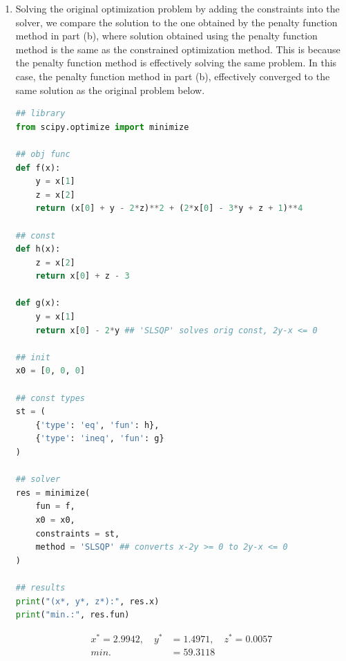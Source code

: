 \documentclass{article}
\begin{document}
\begin{enumerate}
\begin{enumerate}
        \item Solving the original optimization problem by adding the constraints into the solver, we compare the solution to the one obtained by the penalty function method in part (b), where solution obtained using the penalty function method is the same as the constrained optimization method. This is because the penalty function method is effectively solving the same problem. In this case, the penalty function method in part (b), effectively converged to the same solution as the original problem below.\\

\begin{lstlisting}[language=Python, title=Fig. Python 3(d)]
## library
from scipy.optimize import minimize

## obj func
def f(x):
    y = x[1]
    z = x[2]
    return (x[0] + y - 2*z)**2 + (2*x[0] - 3*y + z + 1)**4

## const
def h(x):
    z = x[2]
    return x[0] + z - 3

def g(x):
    y = x[1]
    return x[0] - 2*y ## 'SLSQP' solves orig const, 2y-x <= 0

## init
x0 = [0, 0, 0]

## const types
st = (
    {'type': 'eq', 'fun': h},
    {'type': 'ineq', 'fun': g}
)

## solver
res = minimize(
    fun = f, 
    x0 = x0, 
    constraints = st, 
    method = 'SLSQP' ## converts x-2y >= 0 to 2y-x <= 0
)

## results
print("(x*, y*, z*):", res.x)
print("min.:", res.fun)
\end{lstlisting}

    \begin{equation}
        \begin{split}
            x^* = 2.9942, \quad y^* &= 1.4971, \quad z^* = 0.0057\\
            min. &= 59.3118
        \end{split}
    \end{equation}\\
        
    \end{enumerate}
\end{enumerate}
\end{document}
